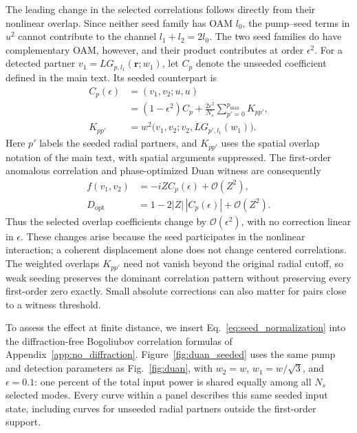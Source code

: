 \documentclass[%
 reprint,
 amsmath,amssymb,
 aps,
pra,
twocolumn,
]{revtex4-2}
\begin{document}
The leading change in the selected correlations follows directly from their nonlinear overlap. Since neither seed family has OAM $l_0$, the pump--seed terms in $u^2$ cannot contribute to the channel $l_1+l_2=2l_0$. The two seed families do have complementary OAM, however, and their product contributes at order $\epsilon^2$. For a detected partner $v_1=LG_{p,l_1}(\mathbf r;w_1)$, let $C_p$ denote the unseeded coefficient defined in the main text. Its seeded counterpart is
\begin{equation}
    \begin{aligned}
        C_p(\epsilon)&=(v_1,v_2;u,u)\\
        &=(1-\epsilon^2)C_p+
                    \frac{2\epsilon^2}{N_s}\sum_{p'=0}^{p_{\max}}K_{pp'},\\
        K_{pp'}&=w^2\bigl(v_1,v_2;v_2,LG_{p',l_1}(w_1)\bigr).
    \end{aligned}
    \label{eq:seed_overlap}
\end{equation}
Here $p'$ labels the seeded radial partners, and $K_{pp'}$ uses the spatial overlap notation of the main text, with spatial arguments suppressed.
The first-order anomalous correlation and phase-optimized Duan witness are consequently
\begin{equation}
    \begin{aligned}
        f(v_1,v_2)&=-iZC_p(\epsilon)+\mathcal{O}(Z^2),\\
        D_{\mathrm{opt}}&=1-2|Z|\,|C_p(\epsilon)|+\mathcal{O}(Z^2).
    \end{aligned}
    \label{eq:multiseed_correlations}
\end{equation}
Thus the selected overlap coefficients change by $\mathcal{O}(\epsilon^2)$, with no correction linear in $\epsilon$. These changes arise because the seed participates in the nonlinear interaction; a coherent displacement alone does not change centered correlations. The weighted overlaps $K_{pp'}$ need not vanish beyond the original radial cutoff, so weak seeding preserves the dominant correlation pattern without preserving every first-order zero exactly. Small absolute corrections can also matter for pairs close to a witness threshold.

To assess the effect at finite distance, we insert Eq.~\eqref{eq:seed_normalization} into the diffraction-free Bogoliubov correlation formulas of Appendix~\ref{app:no_diffraction}. Figure~\ref{fig:duan_seeded} uses the same pump and detection parameters as Fig.~\ref{fig:duan}, with $w_2=w$, $w_1=w/\sqrt{3}$, and $\epsilon=0.1$: one percent of the total input power is shared equally among all $N_s$ selected modes. Every curve within a panel describes this same seeded input state, including curves for unseeded radial partners outside the first-order support.
\end{document}
